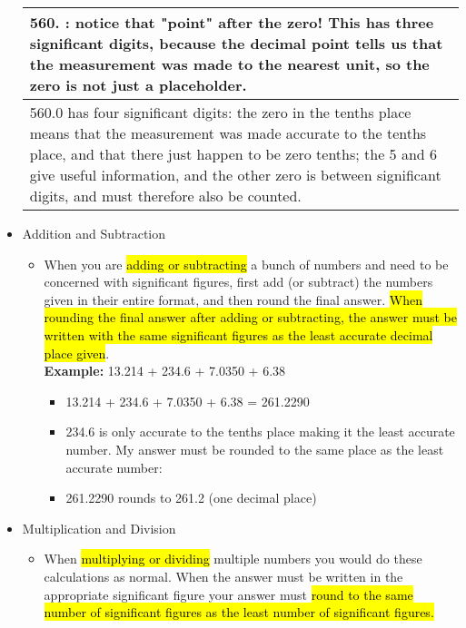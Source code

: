\begin{itemize}
\begin{table}[h]
\begin{tabular}{|p{16cm}|}
\scriptsize{560. : notice that   "point" after the zero! This has three significant digits, because   the decimal point tells us that the measurement was made to the nearest unit,   so the zero is not just a placeholder.                                                                                                  } \\ \hline
\scriptsize{560.0 has four significant   digits: the zero in the tenths place means that the measurement was made   accurate to the tenths place, and that there just happen to be zero tenths;   the 5 and 6 give useful information, and the other zero is between   significant digits, and must therefore also be counted.} \\ \hline
\end{tabular}
\end{table}
\item Addition and Subtraction\\
\begin{itemize}
\item When you are \hl{adding or subtracting} a bunch of numbers and need to be concerned with significant figures, first add (or subtract) the numbers given in their entire format, and then round the final answer. \hl{When rounding the final answer after adding or subtracting, the answer must be written with the same significant figures as the least accurate decimal place given}.\\
\textbf{Example:} 13.214 + 234.6 + 7.0350 + 6.38\\
\begin{itemize}
\item 13.214 + 234.6 + 7.0350 + 6.38 = 261.2290\\
\item 234.6 is only accurate to the tenths place making it the least accurate number. My answer must be rounded to the same place as the least accurate number:\\
\item 261.2290 rounds to 261.2 (one decimal place)\\
\end{itemize}
\end{itemize}
\item Multiplication and Division\\
\begin{itemize}
\item When \hl{multiplying or dividing} multiple numbers you would do these calculations as normal. When the answer must be written in the appropriate significant figure your answer must \hl{round to the same number of significant figures as the least number of significant figures.}\\

\end{itemize}
\end{itemize}
